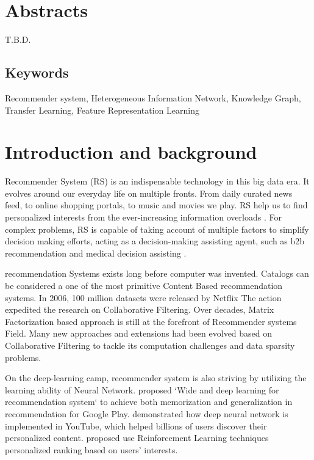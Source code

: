 \section*{Abstracts}
T.B.D.

\subsection*{Keywords} 
Recommender system, Heterogeneous Information Network, Knowledge Graph, Transfer Learning, Feature Representation Learning


\section{Introduction and background}
Recommender System (RS) is an indispensable technology in this big data era. It evolves around our everyday life on multiple fronts. 
From daily curated news feed, to online shopping portals, to music and movies we play. RS help us to find personalized interests from the ever-increasing information overloads \citep{Lu2015}. 
For complex problems, RS is capable of taking account of multiple factors to simplify decision making efforts, acting as a decision-making assisting agent, such as b2b recommendation \citep{shambour2012trust} and medical decision assisting \citep{zhang2017idoctor}.

recommendation Systems exists long before computer was invented. Catalogs can be considered a one of the most primitive Content Based recommendation systems. In 2006, 100 million datasets were released by Netflix \citep{Bennett2007} The action expedited the research on Collaborative Filtering. Over decades, Matrix Factorization based approach is still at the forefront of Recommender systems Field. Many new approaches and extensions had been evolved based on Collaborative Filtering to tackle its computation challenges and data sparsity problems. 

On the deep-learning camp, recommender system is also striving by utilizing the learning ability of Neural Network. \citet{Cheng2016} proposed `Wide and deep learning for recommendation system` to achieve both memorization and generalization in recommendation for Google Play. \citet{Covington2016} demonstrated how deep neural network is implemented in YouTube, which helped billions of users discover their personalized content. \citet{Karatzoglou2013} proposed use Reinforcement Learning techniques personalized ranking based on users’ interests.  

